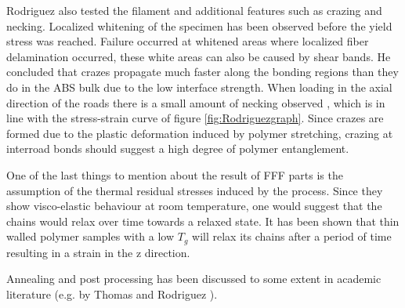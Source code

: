 Rodriguez \cite{Rodriguez2001MechanicalInvestigation} also tested the filament and additional features such as crazing and necking. Localized whitening of the specimen has been observed before the yield stress was reached. Failure occurred at whitened areas where localized fiber delamination occurred, these white areas can also be caused by shear bands. He concluded that crazes propagate much faster along the bonding regions than they do in the ABS bulk due to the low interface strength. When loading in the axial direction of the roads there is a small amount of necking observed \cite{Garg2017AnStudy}, which is in line with the stress-strain curve of figure \ref{fig:Rodriguezgraph}. Since crazes are formed due to the plastic deformation induced by polymer stretching, crazing at interroad bonds should suggest a high degree of polymer entanglement.

One of the last things to mention about the result of FFF parts is the assumption of the thermal residual stresses induced by the process. Since they show visco-elastic behaviour at room temperature, one would suggest that the chains would relax over time towards a relaxed state. It has been shown \cite{VeenEnhancingTemperature} that thin walled polymer samples with a low $T_g$ will relax its chains after a period of time resulting in a strain in the z direction. %

Annealing and post processing has been discussed to some extent in academic literature (e.g. by Thomas and Rodriguez \cite{ThomasMODELINGROADS}).







